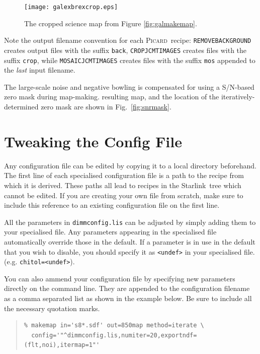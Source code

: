 \documentclass[twoside,11pt]{article}
\newcommand{\htmladdnormallink}[2]{#1}
\newcommand{\xref}[3]{#1}
\newcommand{\xlabel}[1]{}
\renewcommand{\_}{\texttt{\symbol{95}}}
\newenvironment{myquote}{\begin{quote}\begin{small}}{\end{small}\end{quote}}
\newcommand{\starlink}{\htmladdnormallink{Starlink}{http://starlink.jach.hawaii.edu}}
\newcommand{\picard}{\xref{\textsc{Picard}}{sun231}{}}
\newcommand{\drrecipe}[1]{\texttt{#1}}
\begin{document}
\begin{figure}
\begin{center}
\texttt{[image: galex\_brex\_crop.eps]}
\caption{\small The cropped science map from Figure \ref{fig:galmakemap}.}
\label{fig:exptime}
\end{center}
\end{figure}

Note the output filename convention for each \picard\ recipe:
\drrecipe{REMOVE\_BACKGROUND} creates output files with the suffix
\texttt{\_back}, \drrecipe{CROP\_JCMT\_IMAGES} creates files with the
suffix \texttt{\_crop}, while \drrecipe{MOSAIC\_JCMT\_IMAGES} creates
files with the suffix \texttt{\_mos} appended to the \textit{last} input
filename.

The large-scale noise and negative bowling is compensated for using a
S/N-based zero mask during map-making. resulting map, and the location of the
iteratively-determined zero mask are shown in Fig.~\ref{fig:snrmask}.



\clearpage
\section{\xlabel{tweak}Tweaking the Config File}
\label{sec:tweak}
Any configuration file can be edited by copying it to a local directory beforehand. The first line of each specialised configuration file is a path to the recipe from which it is derived. These paths all lead to recipes in the \starlink\ tree which cannot be edited. If you are creating your own file from scratch, make sure to include this reference to an existing configuration file on the first line.

All the parameters in \texttt{dimmconfig.lis} can be adjusted by simply adding them to your specialised file. Any parameters appearing in the specialised file automatically override those in the default. If a parameter is in use in the default that you wish to disable, you should specify it as \texttt{<undef>} in your specialised file. (e.g. \texttt{chitol=<undef>}).

You can also ammend your configuration file by specifying new parameters directly on the command line. They are appended to the configuration  filename as a comma separated list as shown in the example below. Be sure to include all the necessary quotation marks.

\begin{myquote}
\begin{verbatim}
% makemap in='s8*.sdf' out=850map method=iterate \
  config='"^dimmconfig.lis,numiter=20,exportndf=(flt,noi),itermap=1"'
\end{verbatim}
\end{myquote}
\end{document}
